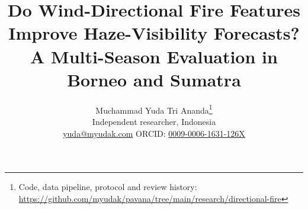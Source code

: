 \documentclass[11pt]{article}
\title{Do Wind-Directional Fire Features Improve Haze-Visibility Forecasts?\\
\large A Multi-Season Evaluation in Borneo and Sumatra}
\author{%
  Muchammad Yuda Tri Ananda\thanks{Code, data pipeline, protocol and review history:
  \url{https://github.com/myudak/pavana/tree/main/research/directional-fire}}\\
  \small Independent researcher, Indonesia\\
  \small \href{mailto:yuda@myudak.com}{yuda@myudak.com}
  \quad ORCID: \href{https://orcid.org/0009-0006-1631-126X}{0009-0006-1631-126X}}
\date{}
\begin{document}
\maketitle

\begin{abstract}

\end{abstract}












\appendix

\end{document}
